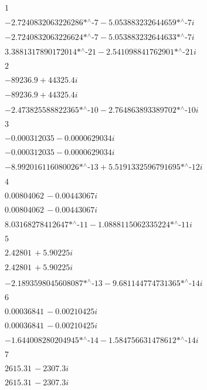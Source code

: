 \noindent\(1\)

\noindent\(-\text{2.7240832063226286$\grave{ }$*${}^{\wedge}$-7}-\text{5.053883232644659$\grave{ }$*${}^{\wedge}$-7} i\)

\noindent\(-\text{2.7240832063226624$\grave{ }$*${}^{\wedge}$-7}-\text{5.053883232644633$\grave{ }$*${}^{\wedge}$-7} i\)

\noindent\(\text{3.3881317890172014$\grave{ }$*${}^{\wedge}$-21}-\text{2.541098841762901$\grave{ }$*${}^{\wedge}$-21} i\)

\noindent\(2\)

\noindent\(-89236.9+44325.4 i\)

\noindent\(-89236.9+44325.4 i\)

\noindent\(-\text{2.473825588822365$\grave{ }$*${}^{\wedge}$-10}-\text{2.764863893389702$\grave{ }$*${}^{\wedge}$-10} i\)

\noindent\(3\)

\noindent\(-0.000312035-0.0000629034 i\)

\noindent\(-0.000312035-0.0000629034 i\)

\noindent\(-\text{8.992016116080026$\grave{ }$*${}^{\wedge}$-13}+\text{5.5191332596791695$\grave{ }$*${}^{\wedge}$-12} i\)

\noindent\(4\)

\noindent\(0.00804062\, -0.00443067 i\)

\noindent\(0.00804062\, -0.00443067 i\)

\noindent\(\text{8.03168278412647$\grave{ }$*${}^{\wedge}$-11}-\text{1.0888115062335224$\grave{ }$*${}^{\wedge}$-11} i\)

\noindent\(5\)

\noindent\(2.42801\, +5.90225 i\)

\noindent\(2.42801\, +5.90225 i\)

\noindent\(-\text{2.1893598045608087$\grave{ }$*${}^{\wedge}$-13}-\text{9.681144774731365$\grave{ }$*${}^{\wedge}$-14} i\)

\noindent\(6\)

\noindent\(0.00036841\, -0.00210425 i\)

\noindent\(0.00036841\, -0.00210425 i\)

\noindent\(-\text{1.644008280204945$\grave{ }$*${}^{\wedge}$-14}-\text{1.584756631478612$\grave{ }$*${}^{\wedge}$-14} i\)

\noindent\(7\)

\noindent\(2615.31\, -2307.3 i\)

\noindent\(2615.31\, -2307.3 i\)

